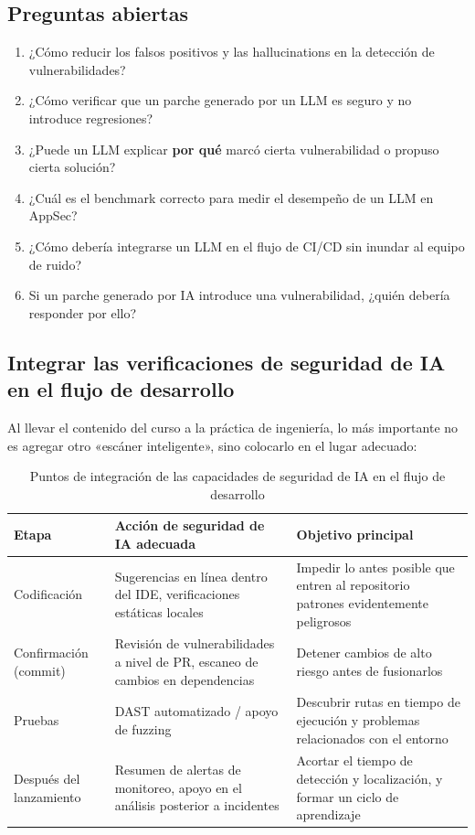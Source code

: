 \subsection{Preguntas abiertas}

\begin{enumerate}
    \item ¿Cómo reducir los falsos positivos y las hallucinations en la detección de vulnerabilidades?
    \item ¿Cómo verificar que un parche generado por un LLM es seguro y no introduce regresiones?
    \item ¿Puede un LLM explicar \textbf{por qué} marcó cierta vulnerabilidad o propuso cierta solución?
    \item ¿Cuál es el benchmark correcto para medir el desempeño de un LLM en AppSec?
    \item ¿Cómo debería integrarse un LLM en el flujo de CI/CD sin inundar al equipo de ruido?
    \item Si un parche generado por IA introduce una vulnerabilidad, ¿quién debería responder por ello?
\end{enumerate}

\subsection{Integrar las verificaciones de seguridad de IA en el flujo de desarrollo}

Al llevar el contenido del curso a la práctica de ingeniería, lo más importante no es agregar otro «escáner inteligente», sino colocarlo en el lugar adecuado:

\begin{table}[H]
\centering
\begin{tabular}{p{} p{} p{}}
\toprule
Etapa & Acción de seguridad de IA adecuada & Objetivo principal \\
\midrule
Codificación & Sugerencias en línea dentro del IDE, verificaciones estáticas locales & Impedir lo antes posible que entren al repositorio patrones evidentemente peligrosos \\
Confirmación (commit) & Revisión de vulnerabilidades a nivel de PR, escaneo de cambios en dependencias & Detener cambios de alto riesgo antes de fusionarlos \\
Pruebas & DAST automatizado / apoyo de fuzzing & Descubrir rutas en tiempo de ejecución y problemas relacionados con el entorno \\
Después del lanzamiento & Resumen de alertas de monitoreo, apoyo en el análisis posterior a incidentes & Acortar el tiempo de detección y localización, y formar un ciclo de aprendizaje \\
\bottomrule
\end{tabular}
\caption{Puntos de integración de las capacidades de seguridad de IA en el flujo de desarrollo}
\end{table}

